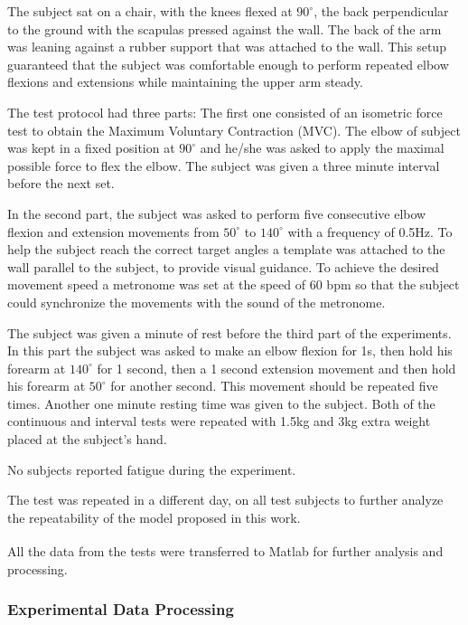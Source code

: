 The subject sat on a chair, with the knees flexed at \(90^{\circ}\), the back perpendicular to the ground with the scapulas pressed against the wall. The back of the arm was leaning against a rubber support that was attached to the wall. This setup guaranteed that the subject was comfortable enough to perform repeated elbow flexions and extensions while maintaining the upper arm steady. 

The test protocol had three parts: The first one consisted of an isometric force test to obtain the Maximum Voluntary Contraction (MVC). The elbow of subject was kept in a fixed position at \(90^{\circ}\) and he/she was asked to apply the maximal possible force to flex the elbow. The subject was given a three minute interval before the next set.


In the second part, the subject was asked to perform five consecutive elbow flexion and extension movements from  \(50^{\circ}\) to \(140^{\circ}\) with a frequency of 0.5Hz. To help the subject reach the correct target angles a template was attached to the wall parallel to the subject, to provide visual guidance. To achieve the desired movement speed a metronome was set at the speed of 60 bpm so that the subject could synchronize the movements with the sound of the metronome.    

   The subject was given a minute of rest before the third part of the experiments. In this part the subject was asked to make an elbow flexion for 1s, then hold his forearm at \(140^{\circ}\) for 1 second, then a 1 second extension movement and then hold his forearm at \(50^{\circ}\) for another second. This movement should be repeated five times. Another one minute resting time was given to the subject.
Both of the continuous and interval tests were repeated with 1.5kg and 3kg extra weight placed at the subject's hand.

No subjects reported fatigue during the experiment.

The test was repeated in a different day, on all test subjects to further analyze the repeatability of the model proposed in this work.

All the data from the tests were transferred to Matlab\textsuperscript{\textregistered} for further analysis and processing.



\subsubsection{Experimental Data Processing}

